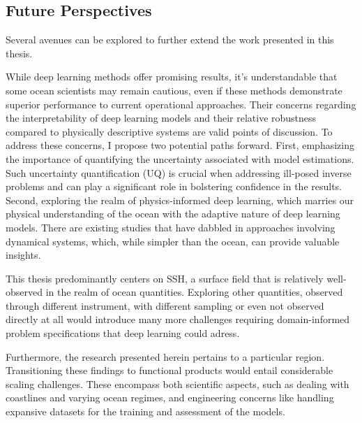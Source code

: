 \begin{bibunit}
\section*{Future Perspectives}

Several avenues can be explored to further extend the work presented in this thesis.

While deep learning methods offer promising results, it's understandable that some ocean scientists may remain cautious, even if these methods demonstrate superior performance to current operational approaches. Their concerns regarding the interpretability of deep learning models and their relative robustness compared to physically descriptive systems are valid points of discussion.
To address these concerns, I propose two potential paths forward. First, emphasizing the importance of quantifying the uncertainty associated with model estimations. Such uncertainty quantification (UQ) is crucial when addressing ill-posed inverse problems and can play a significant role in bolstering confidence in the results. Second, exploring the realm of physics-informed deep learning, which marries our physical understanding of the ocean with the adaptive nature of deep learning models. There are existing studies that have dabbled in approaches involving dynamical systems, which, while simpler than the ocean, can provide valuable insights.

This thesis predominantly centers on SSH, a surface field that is relatively well-observed in the realm of ocean quantities. Exploring other quantities, observed through different instrument, with different sampling or even not observed directly at all would introduce many more challenges requiring domain-informed problem specifications that deep learning could adress.

Furthermore, the research presented herein pertains to a particular region. Transitioning these findings to functional products would entail considerable scaling challenges. These encompass both scientific aspects, such as dealing with coastlines and varying ocean regimes, and engineering concerns like handling expansive datasets for the training and assessment of the models.






\end{bibunit}
